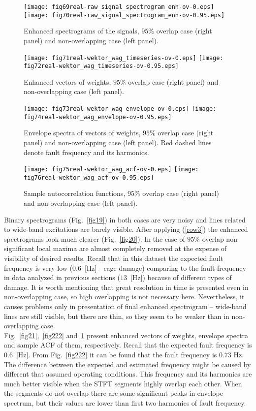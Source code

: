 \documentclass[3p,times]{elsarticle}
\begin{document}
\begin{figure}[!ht]
\begin{center}
\texttt{[image: fig69real-raw\_signal\_spectrogram\_enh-ov-0.eps]}
\texttt{[image: fig70real-raw\_signal\_spectrogram\_enh-ov-0.95.eps]}\caption{Enhanced spectrograms of the signals, $95\%$ overlap case (right panel) and non-overlapping case (left panel).}\label{fig20}
\texttt{[image: fig71real-wektor\_wag\_timeseries-ov-0.eps]}
\texttt{[image: fig72real-wektor\_wag\_timeseries-ov-0.95.eps]}\caption{Enhanced vectors of weights, $95\%$ overlap case (right panel) and non-overlapping case (left panel).}\label{fig21}
\texttt{[image: fig73real-wektor\_wag\_envelope-ov-0.eps]}
\texttt{[image: fig74real-wektor\_wag\_envelope-ov-0.95.eps]}
\caption{Envelope spectra of vectors of weights, $95\%$ overlap case (right panel) and non-overlapping case (left panel). Red dashed lines denote fault frequency and its harmonics.}\label{fig222}
\texttt{[image: fig75real-wektor\_wag\_acf-ov-0.eps]}
\texttt{[image: fig76real-wektor\_wag\_acf-ov-0.95.eps]}
\caption{Sample autocorrelation functions, $95\%$ overlap case (right panel) and non-overlapping case (left panel).}\label{fig23}
\end{center}
\end{figure}
Binary spectrograms (Fig.~\ref{fig19}) in both cases are very noisy and lines related to wide-band excitations are barely visible. After applying (\ref{row3}) the enhanced spectrograms look much clearer (Fig.~\ref{fig20}). In the case of $95\%$ overlap non-significant local maxima are almost completely removed at the expense of visibility of desired results. Recall that in this dataset the expected fault frequency is very low ($0.6$~[Hz] - cage damage) comparing to the fault frequency in data analyzed in previous sections ($13$~[Hz]) because of different types of damage. It is worth mentioning that great resolution in time is presented even in non-overlapping case, so high overlapping is not necessary here. Nevertheless, it causes problems only in presentation of final enhanced spectrogram -- wide-band lines are still visible, but there are thin, so they seem to be weaker than in non-overlapping case.\\
Fig.~\ref{fig21},~\ref{fig222} and~\ref{fig23} present enhanced vectors of weights, envelope spectra and sample ACF of them, respectively. Recall that the expected fault frequency is $0.6$~[Hz]. From Fig.~\ref{fig222} it can be found that the fault frequency is $0.73$ Hz. The difference between the expected and estimated frequency might be caused by different that assumed operating conditions. This frequency and its harmonics are much better visible when the STFT segments highly overlap each other. When the segments do not overlap there are some significant peaks in envelope spectrum, but their values are lower than first two harmonics of fault frequency.\\
\end{document}
